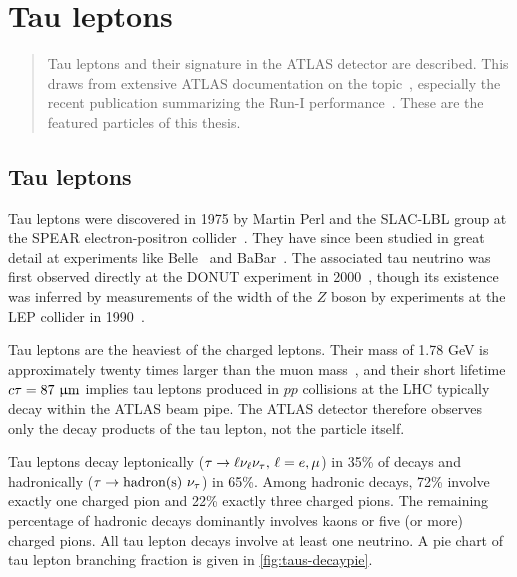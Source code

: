 \chapter[Tau leptons][Tau leptons]{Tau leptons}
\label{chap:taus}

\begin{quote}
  Tau leptons and their signature in the ATLAS detector are described. This draws from extensive ATLAS documentation on the topic~\cite{ATLAS-CONF-2012-142,ATLAS-CONF-2013-064,ATLAS-CONF-2013-044}, especially the recent publication summarizing the Run-I performance~\cite{PERF-2013-06}. These are the featured particles of this thesis.
\end{quote}


\section{Tau leptons}
\label{sec:taus-theory}

Tau leptons were discovered in 1975 by Martin Perl and the SLAC-LBL group at the SPEAR electron-positron collider~\cite{1975.Perl.discovery_of_tau_1,1976.Perl.discovery_of_tau_2,1977.Perl.discovery_of_tau_3}. They have since been studied in great detail at experiments like Belle~\cite{2014.belle.tau-lifetime} and BaBar~\cite{2009.babar.tau-mass}. The associated tau neutrino was first observed directly at the DONUT experiment in 2000~\cite{2001.Kodama.discovery_of_tau_neutrino}, though its existence was inferred by measurements of the width of the $Z$ boson by experiments at the LEP collider in 1990~\cite{1990.ALEPH.3-neutrino-families}.

Tau leptons are the heaviest of the charged leptons. Their mass of 1.78 GeV is approximately twenty times larger than the muon mass~\cite{2012.PDG}, and their short lifetime $c\tau = \text{87 } \upmu\text{m}$ implies tau leptons produced in $pp$ collisions at the LHC typically decay within the ATLAS beam pipe. The ATLAS detector therefore observes only the decay products of the tau lepton, not the particle itself.

Tau leptons decay leptonically ($\tau \rightarrow \ell\nu_\ell\nu_\tau \text{, } \ell = e,\mu$) in 35\% of decays and hadronically ($\tau \rightarrow \text{hadron(s) }\nu_\tau$) in 65\%. Among hadronic decays, 72\% involve exactly one charged pion and 22\% exactly three charged pions. The remaining percentage of hadronic decays dominantly involves kaons or five (or more) charged pions. All tau lepton decays involve at least one neutrino. A pie chart of tau lepton branching fraction is given in \cref{fig:taus-decaypie}.

